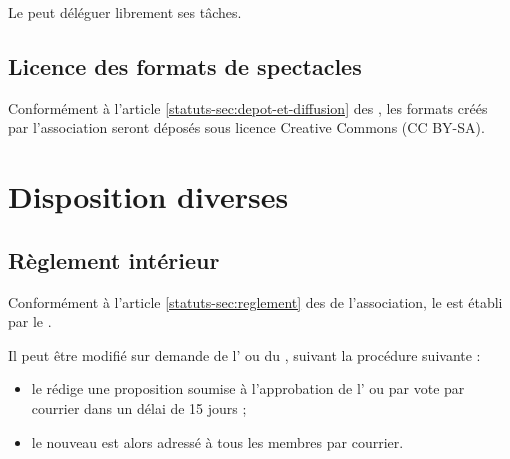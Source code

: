 \documentclass[a4paper,french,10pt]{article}
\newcommand{\article}[1]{\subsection{#1}\addtocounter{article}{1}}
\newcounter{article}
\newcommand{\artrefst}[1]{article \ref{statuts-#1} des \statuts{}}
\begin{document}
Le \DA{} peut déléguer librement ses tâches.

\article{Licence des formats de spectacles}
\label{sec:licence-des-formats}
Conformément à l'\artrefst{sec:depot-et-diffusion}, les formats créés par l'association seront déposés sous licence Creative Commons (CC BY-SA).


\section{Disposition diverses}
\article{Règlement intérieur}
\label{sec:reglement-interieur}
Conformément à l'\artrefst{sec:reglement} de l'association, le \RI{} est établi par le \bureau{}.

Il peut être modifié sur demande de l'\AG{} ou du \bureau{}, suivant la procédure suivante :
\begin{itemize}
\item le \bureau{} rédige une proposition soumise à l'approbation de l'\AG{} ou par vote par courrier dans un délai de 15 jours ;
\item le nouveau \RI{} est alors adressé à tous les membres par courrier.
\end{itemize}
\end{document}
